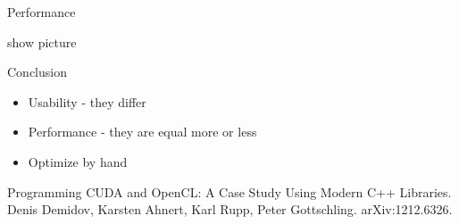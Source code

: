 \documentclass{beamer}
\newcommand{\rem}[1]{}
\newcommand{\heading}[1]{\centerline{\Large #1} \vspace{0.5em}}
\begin{document}
\begin{frame}[fragile]
 \heading{Performance}

 show picture
\end{frame}

\begin{frame}[fragile]
 \heading{Conclusion}

 \begin{itemize}
  \item Usability - they differ
  \item Performance - they are equal more or less
  \item Optimize by hand
 \end{itemize}

 Programming CUDA and OpenCL: A Case Study Using Modern C++ Libraries. Denis Demidov, Karsten Ahnert, Karl Rupp, Peter Gottschling. arXiv:1212.6326.

\end{frame}





\rem{




%



%
}
\end{document}
